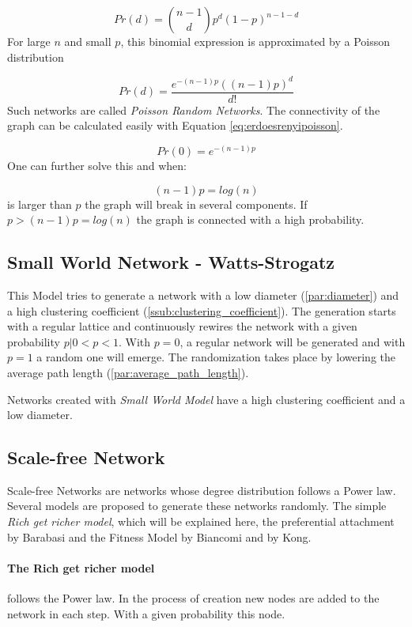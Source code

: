 \begin{equation}
\label{eq:erdoesrenyidegreedist}
	Pr(d) = \binom{n-1}{d} p^d(1-p)^{n-1-d}
\end{equation}
For large $n$ and small $p$,
this binomial expression is approximated by a Poisson distribution

\begin{equation}
\label{eq:erdoesrenyipoisson}
	Pr(d) = \frac{e^{-(n-1)p}((n-1)p)^d}{d!}
\end{equation}
Such networks are called \emph{Poisson Random Networks}.
The connectivity of the graph can be calculated easily with Equation \ref{eq:erdoesrenyipoisson}.

\begin{equation}
	Pr(0) = e^{-(n-1)p}
\end{equation}
One can further solve this and when:

\begin{equation}
	(n-1)p= log (n)
\end{equation}
is larger than $p$ the graph will break in several components.
If $p > (n-1)p= log (n)$ the graph is connected with a high probability.

\subsection[Small World Network]{Small World Network - Watts-Strogatz} %
\label{sub:watts_strogatz}
This Model tries to generate a network with a low diameter (\ref{par:diameter})
and a high clustering coefficient (\ref{ssub:clustering_coefficient}).
The generation starts with a regular lattice
and continuously rewires the network with a given probability $p | 0<p<1$.
With $p = 0$, a regular network will be generated
and with $p = 1$ a random one will emerge.
The randomization takes place by lowering the average path length (\ref{par:average_path_length}).

Networks created with \emph{Small World Model} have a high clustering coefficient
and a low diameter.

\subsection{Scale-free Network} %
\label{sub:scale_free_network}
Scale-free Networks are networks whose degree distribution follows a Power law.
Several models are proposed to generate these networks randomly.
The simple \emph{Rich get richer model},
which will be explained here,
the preferential attachment by Barabasi 
and the Fitness Model by Biancomi and by Kong.

\paragraph{The Rich get richer model} %
\label{par:the_rich_get_richer_model}
follows the Power law.
In the process of creation new nodes are added to the network in each step.
With a given probability this node.


